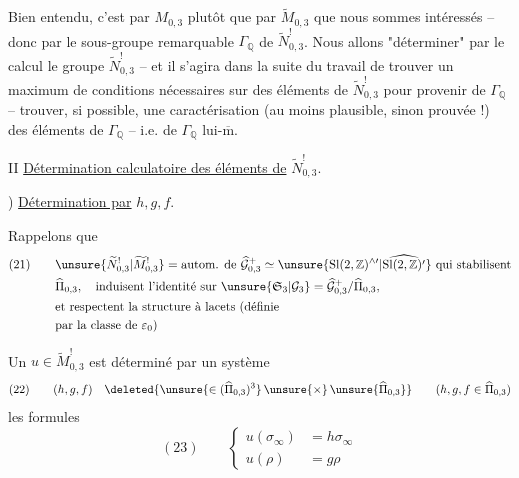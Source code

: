 Bien entendu, c'est par $M_{0,3}$  plutôt que par $\widetilde M_{0,3}$  que nous sommes intéressés -- donc par le sous-groupe remarquable $\Gamma_{\mathbb Q}$ de $\widetilde N_{0,3}^{!}$. Nous allons "déterminer" par le calcul le groupe $\widetilde N_{0,3}^{!}$ -- et il s'agira dans la suite du travail de trouver un maximum de conditions nécessaires sur des éléments de $\widetilde N_{0,3}^{!}$ pour provenir de $\Gamma_{\mathbb Q}$ --  trouver, si possible, une caractérisation (au moins plausible, sinon prouvée !) des éléments de $\Gamma_{\mathbb Q}$ -- i.e. de $\Gamma_{\mathbb Q}$ lui-$\overline{\mathrm m}$.


II \uline{Détermination calculatoire des éléments de} $\widetilde N_{0,3}^{!}$.\par{}) \uline{Détermination par} $h,g,f$.


Rappelons que
\[
\begin{aligned}
(21)\qquad
&\unsure{\widetilde N_{0,3}^{!}|\widetilde M_{0,3}^{!}}
=\text{autom. de }\widehat{\mathcal G}_{0,3}^{+}
\simeq\unsure{\mathrm{Sl}(2,\mathbb Z)^{\wedge\prime}|\widehat{\mathrm{Sl}(2,\mathbb Z)^{\prime}}}
\text{ qui stabilisent}\\
&\widehat\Pi_{0,3},\quad\text{induisent l'identité sur }
\unsure{\mathfrak S_3|\mathcal G_3}
=\widehat{\mathcal G}_{0,3}^{+}/\widehat\Pi_{0,3},\\
&\text{et respectent la structure à lacets (définie}\\
&\text{par la classe de }\varepsilon_0\text{)}
\end{aligned}
\]

Un $u\in\widetilde M_{0,3}^{!}$ est déterminé par un système
\[
(22)\qquad (h,g,f)\quad
\deleted{\unsure{\in(\widehat{\Pi}_{0,3})^{3}}\,\unsure{\times}\,\unsure{\widehat{\Pi}_{0,3}}}
\qquad(h,g,f\in\widehat\Pi_{0,3})
\]
 les formules
\[
(23)\qquad
\left\{\begin{aligned}
u(\sigma_\infty)&=h\sigma_\infty\\
u(\rho)&=g\rho
\end{aligned}\right.
\]

